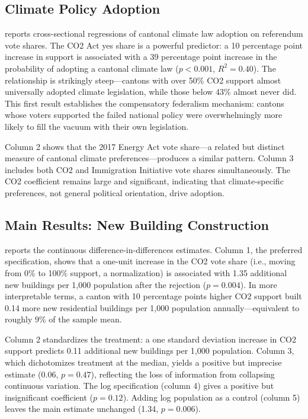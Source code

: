 \documentclass[12pt]{article}
\begin{document}
\subsection{Climate Policy Adoption}

 reports cross-sectional regressions of cantonal climate law adoption on referendum vote shares. The CO2 Act yes share is a powerful predictor: a 10 percentage point increase in support is associated with a 39 percentage point increase in the probability of adopting a cantonal climate law ($p < 0.001$, $R^2 = 0.40$). The relationship is strikingly steep---cantons with over 50\% CO2 support almost universally adopted climate legislation, while those below 43\% almost never did. This first result establishes the compensatory federalism mechanism: cantons whose voters supported the failed national policy were overwhelmingly more likely to fill the vacuum with their own legislation.

Column 2 shows that the 2017 Energy Act vote share---a related but distinct measure of cantonal climate preferences---produces a similar pattern. Column 3 includes both CO2 and Immigration Initiative vote shares simultaneously. The CO2 coefficient remains large and significant, indicating that climate-specific preferences, not general political orientation, drive adoption.



\subsection{Main Results: New Building Construction}

 reports the continuous difference-in-differences estimates. Column 1, the preferred specification, shows that a one-unit increase in the CO2 vote share (i.e., moving from 0\% to 100\% support, a normalization) is associated with 1.35 additional new buildings per 1,000 population after the rejection ($p = 0.004$). In more interpretable terms, a canton with 10 percentage points higher CO2 support built 0.14 more new residential buildings per 1,000 population annually---equivalent to roughly 9\% of the sample mean.

Column 2 standardizes the treatment: a one standard deviation increase in CO2 support predicts 0.11 additional new buildings per 1,000 population. Column 3, which dichotomizes treatment at the median, yields a positive but imprecise estimate (0.06, $p = 0.47$), reflecting the loss of information from collapsing continuous variation. The log specification (column 4) gives a positive but insignificant coefficient ($p = 0.12$). Adding log population as a control (column 5) leaves the main estimate unchanged (1.34, $p = 0.006$).
\end{document}
